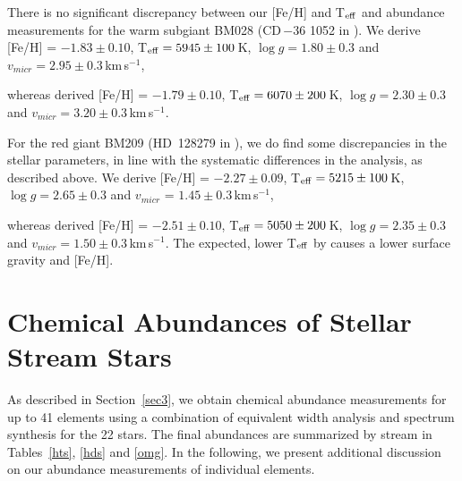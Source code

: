 \documentclass[twocolumn]{aastex63}
\newcommand{\kms}{km\,s$^{-1}$}
\begin{document}
There is no significant discrepancy between our [Fe/H] and T$_{\rm eff}$ and abundance measurements for the warm subgiant BM028 (CD\,$-$36 1052 in \citeauthor{Roederer10}).  We derive 
[Fe/H] = $-1.83 \pm 0.10$, 
T$_{\rm eff} =5945 \pm 100$\,K, 
$\log g = 1.80 \pm 0.3$ and 
$v_{micr} = 2.95 \pm 0.3$\,\kms, 

whereas \citet{Roederer10} derived 
[Fe/H] = $-1.79 \pm 0.10$, 
T$_{\rm eff}=6070 \pm 200$\,K, 
$\log g = 2.30 \pm 0.3$ and 
$v_{micr} =3.20 \pm 0.3$\,\kms. 

For the red giant BM209 (HD~128279 in \citeauthor{Roederer10}), we do find some discrepancies in the stellar parameters, in line with the systematic differences in the analysis, as described above. We derive 
[Fe/H] = $-2.27 \pm 0.09$, 
T$_{\rm eff} =5215 \pm 100$\,K, 
$\log g = 2.65 \pm 0.3$ and 
$v_{micr}$ = $ 1.45 \pm 0.3 $\,\kms, 

whereas \citet{Roederer10} derived 
[Fe/H] = $-2.51 \pm 0.10$, 
T$_{\rm eff}=5050 \pm 200$\,K, 
$\log g = 2.35 \pm 0.3$ and 
$v_{micr} =1.50 \pm 0.3$\,\kms. 
The expected, lower T$_{\rm eff}$ by \citet{Roederer10} causes a lower surface gravity and [Fe/H]. 


\vspace{0.5cm}

\section{Chemical Abundances of Stellar Stream Stars}

As described in Section~\ref{sec3}, we obtain chemical abundance measurements for up to 41 elements using a combination of equivalent width analysis and spectrum synthesis for the 22 stars. The final abundances are summarized by stream in Tables~\ref{hts}, \ref{hds} and \ref{omg}. In the following, we present additional discussion on our abundance measurements of individual elements. 
\end{document}
